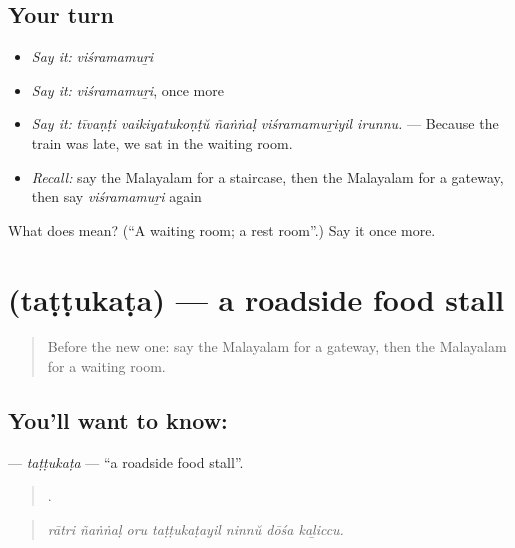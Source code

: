 \subsection*{Your turn}
\begin{itemize}
\raggedright
  \item \emph{Say it:} \emph{viśramamuṟi}
  \item \emph{Say it:} \emph{viśramamuṟi}, once more
  \item \emph{Say it:} \emph{tīvaṇṭi vaikiyatukoṇṭŭ ñaṅṅaḷ viśramamuṟiyil irunnu.} — Because the train was late, we sat in the waiting room.
  \item \emph{Recall:} say the Malayalam for a staircase, then the Malayalam for a gateway, then say \emph{viśramamuṟi} again
\end{itemize}

\begin{tcolorbox}[breakable,colback=teal!4,colframe=teal!35!black,title={Before you move on}]
What does  mean? (\textquotedblleft{}A waiting room; a rest room\textquotedblright{}.) Say it once more.
\end{tcolorbox}
\section[\texorpdfstring{\ml{തട്ടുകട} (taṭṭukaṭa)}{തട്ടുകട (taṭṭukaṭa)}]{ (taṭṭukaṭa) — a roadside food stall}

\label{lesson:ML-C485-tattukata}



\begin{quote}
Before the new one: say the Malayalam for a gateway, then the Malayalam for a waiting room.
\end{quote}

\subsection*{You'll want to know: }
\textbf{} — \emph{taṭṭukaṭa} — \textquotedblleft{}a roadside food stall\textquotedblright{}.

\begin{quote}
      .
\end{quote}

\begin{quote}
\emph{rātri ñaṅṅaḷ oru taṭṭukaṭayil ninnŭ dōśa kaḻiccu.}
\end{quote}

